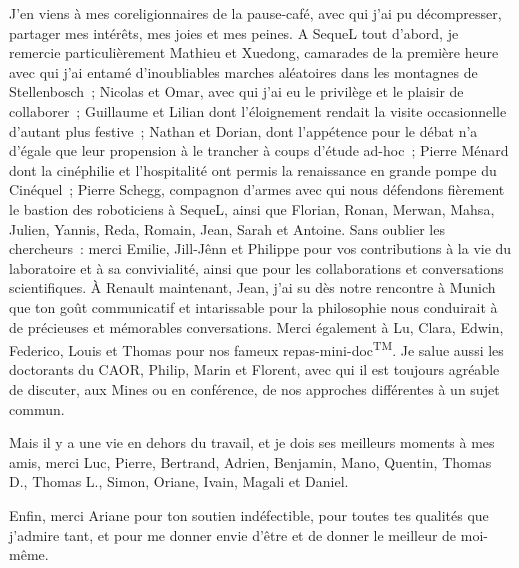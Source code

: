 \begin{acknowledgements}
J'en viens à mes coreligionnaires de la pause-café, avec qui j'ai pu décompresser, partager mes intérêts, mes joies et mes peines. A SequeL tout d'abord, je remercie particulièrement Mathieu et Xuedong, camarades de la première heure avec qui j'ai entamé d'inoubliables marches aléatoires dans les montagnes de Stellenbosch~; Nicolas et Omar, avec qui j'ai eu le privilège et le plaisir de collaborer~; Guillaume et Lilian dont l'éloignement rendait la visite occasionnelle d'autant plus festive~; Nathan et Dorian, dont l'appétence pour le débat n'a d'égale que leur propension à le trancher à coups d'étude ad-hoc~;  Pierre Ménard dont la cinéphilie et l'hospitalité ont permis la renaissance en grande pompe du Cinéquel~; Pierre Schegg, compagnon d'armes avec qui nous défendons fièrement le bastion des roboticiens à SequeL, ainsi que Florian, Ronan, Merwan, Mahsa, Julien, Yannis, Reda, Romain, Jean, Sarah et Antoine. Sans oublier les chercheurs~: merci Emilie, Jill-Jênn et Philippe pour vos contributions à la vie du laboratoire et à sa convivialité, ainsi que pour les collaborations et conversations scientifiques.
À Renault maintenant, Jean, j'ai su dès notre rencontre à Munich que ton goût communicatif et intarissable pour la philosophie nous conduirait à de précieuses et mémorables conversations. Merci également à Lu, Clara, Edwin, Federico, Louis et Thomas pour nos fameux repas-mini-doc\textsuperscript{\tiny\textsf{TM}}. Je salue aussi les doctorants du CAOR, Philip, Marin et Florent, avec qui il est toujours agréable de discuter, aux Mines ou en conférence, de nos approches différentes à un sujet commun.

Mais il y a une vie en dehors du travail, et je dois ses meilleurs moments à mes amis, merci Luc, Pierre, Bertrand, Adrien, Benjamin, Mano, Quentin, Thomas D., Thomas L., Simon, Oriane, Ivain, Magali et Daniel.

Enfin, merci Ariane pour ton soutien indéfectible, pour toutes tes qualités que j'admire tant, et pour me donner envie d'être et de donner le meilleur de moi-même.
\end{acknowledgements}